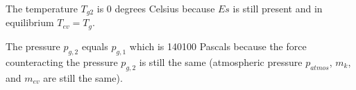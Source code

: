 The temperature \( T_{g2} \) is 0 degrees Celsius because \( Es \) is still present and in equilibrium \( T_{ev} = T_g \).

The pressure \( p_{g,2} \) equals \( p_{g,1} \) which is 140100 Pascals because the force counteracting the pressure \( p_{g,2} \) is still the same (atmospheric pressure \( p_{atmos} \), \( m_k \), and \( m_{ev} \) are still the same).